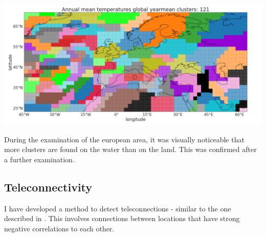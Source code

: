 \documentclass[a0,portrait]{a0poster}
\begin{document}
\begin{multicols}{3}
\begin{center}\vspace{1cm}
\includegraphics[width=1\linewidth]{globtascluster.png}
\end{center}\vspace{1cm}

During the examination of the european area, it was visually noticeable that more clusters are found on the water than on the land. This was confirmed after a further examination. 


\subsection{Teleconnectivity}
I have developed a method to detect teleconnections - similar to the one described in \cite{teleconn}. This involves connections between locations that have strong negative correlations to each other.


\end{multicols}
\end{document}
